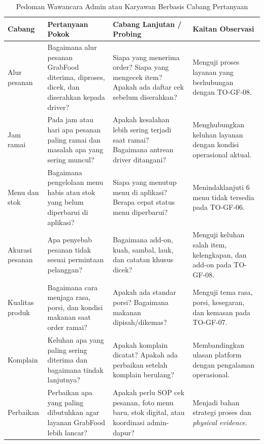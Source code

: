 \begin{table}[!htbp]
    \centering
    \caption{Pedoman Wawancara Admin atau Karyawan Berbasis Cabang Pertanyaan}
    \label{tab:pedoman-wawancara-admin-karyawan}
    \scriptsize
    \setlength{\tabcolsep}{3pt}
    \renewcommand{\arraystretch}{0.92}
    \begin{tabularx}{\textwidth}{|Z{2.2cm}|Y|Y|Y|}
        \toprule
        \textbf{Cabang} & \textbf{Pertanyaan Pokok} & \textbf{Cabang Lanjutan / Probing} & \textbf{Kaitan Observasi} \\ \hline
        \midrule
        Alur pesanan & Bagaimana alur pesanan GrabFood diterima, diproses, dicek, dan diserahkan kepada driver? & Siapa yang menerima order? Siapa yang mengecek item? Apakah ada daftar cek sebelum diserahkan? & Menguji proses layanan yang berhubungan dengan TO-GF-08. \\ \hline
        Jam ramai & Pada jam atau hari apa pesanan paling ramai dan masalah apa yang sering muncul? & Apakah kesalahan lebih sering terjadi saat ramai? Bagaimana antrean driver ditangani? & Menghubungkan keluhan layanan dengan kondisi operasional aktual. \\ \hline
        Menu dan stok & Bagaimana pengelolaan menu habis atau stok yang belum diperbarui di aplikasi? & Siapa yang menutup menu di aplikasi? Berapa cepat status menu diperbarui? & Menindaklanjuti 6 menu tidak tersedia pada TO-GF-06. \\ \hline
        Akurasi pesanan & Apa penyebab pesanan tidak sesuai permintaan pelanggan? & Bagaimana add-on, kuah, sambal, lauk, dan catatan khusus dicek? & Menguji keluhan salah item, kelengkapan, dan add-on pada TO-GF-08. \\ \hline
        Kualitas produk & Bagaimana cara menjaga rasa, porsi, dan kondisi makanan saat order ramai? & Apakah ada standar porsi? Bagaimana makanan dipisah/dikemas? & Menguji tema rasa, porsi, kesegaran, dan kemasan pada TO-GF-07. \\ \hline
        Komplain & Keluhan apa yang paling sering diterima dan bagaimana tindak lanjutnya? & Apakah komplain dicatat? Apakah ada perbaikan setelah komplain berulang? & Membandingkan ulasan platform dengan pengalaman operasional. \\ \hline
        Perbaikan & Perbaikan apa yang paling dibutuhkan agar layanan GrabFood lebih lancar? & Apakah perlu SOP cek pesanan, foto menu baru, stok digital, atau koordinasi admin-dapur? & Menjadi bahan strategi proses dan \textit{physical evidence}. \\ \hline
        \bottomrule
    \end{tabularx}
\end{table}

